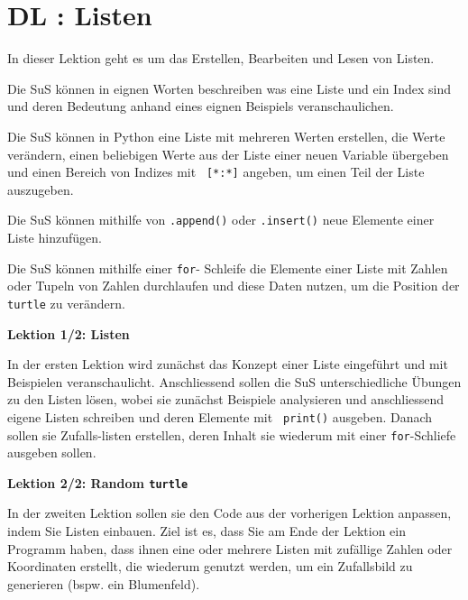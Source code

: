 \section{DL \themycounter: Listen}
\begin{myExBox}[title=DL \themycounter]
In dieser Lektion geht es um das Erstellen, Bearbeiten und Lesen von Listen.

\begin{todolist}
    \item Die SuS können in eignen Worten beschreiben was eine Liste und ein Index sind und deren Bedeutung anhand eines eignen Beispiels veranschaulichen.
    \item Die SuS können in Python eine Liste mit mehreren Werten erstellen, die Werte verändern, einen beliebigen Werte aus der Liste einer neuen Variable übergeben und einen Bereich von Indizes mit \lstinline| [*:*]| angeben, um einen Teil der Liste auszugeben.
    \item Die SuS können mithilfe von \lstinline|.append()| oder \lstinline|.insert()| neue Elemente einer Liste hinzufügen.
    \item Die SuS können mithilfe einer \lstinline|for|-  Schleife die Elemente einer Liste mit Zahlen oder Tupeln von Zahlen durchlaufen und diese Daten nutzen, um die Position der \lstinline|turtle| zu verändern.
\end{todolist}

\textbf{Lektion 1/2: Listen}

In der ersten Lektion wird zunächst das Konzept einer Liste eingeführt und mit Beispielen veranschaulicht. Anschliessend sollen die SuS unterschiedliche Übungen zu den Listen lösen, wobei sie zunächst Beispiele analysieren und anschliessend eigene Listen schreiben und deren Elemente mit \lstinline| print()| ausgeben. Danach sollen sie Zufalls-listen erstellen, deren Inhalt sie wiederum mit einer \lstinline|for|-Schliefe ausgeben sollen.

\textbf{Lektion 2/2: Random \lstinline|turtle|}

In der zweiten Lektion sollen sie den Code aus der vorherigen Lektion anpassen, indem Sie Listen einbauen. Ziel ist es, dass Sie am Ende der Lektion ein Programm haben, dass ihnen eine oder mehrere Listen mit zufällige Zahlen oder Koordinaten erstellt, die wiederum genutzt werden, um ein Zufallsbild zu generieren (bspw. ein Blumenfeld).


\end{myExBox}
